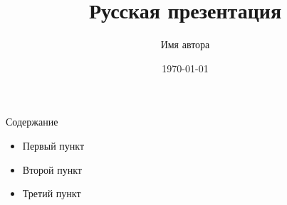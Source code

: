 \documentclass{beamer}
\title{Русская презентация}
\author{Имя автора}
\date{\today}
\begin{document}
\begin{frame}
  \titlepage
\end{frame}

\begin{frame}{Содержание}
  \begin{itemize}
    \item Первый пункт
    \item Второй пункт
    \item Третий пункт
  \end{itemize}
\end{frame}
\end{document}
